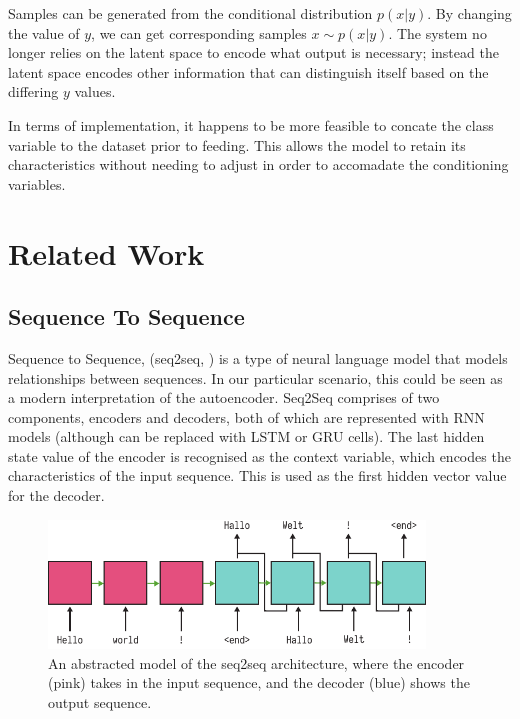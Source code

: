 \documentclass[12pt,twoside]{report}
\begin{document}
Samples can be generated from the conditional distribution $p(x|y)$. By changing the value of $y$, we can get corresponding samples $x \sim p(x|y)$. The system no longer relies on the latent space to encode what output is necessary; instead the latent space encodes other information that can distinguish itself based on the differing $y$ values.



In terms of implementation, it happens to be more feasible to concate the class variable to the dataset prior to feeding. This allows the model to retain its characteristics without needing to adjust in order to accomadate the conditioning variables.


\section{Related Work}

\subsection{Sequence To Sequence}

Sequence to Sequence, (seq2seq, \cite{sutskever_sequence_2014}) is a type of neural language model that models relationships between sequences. In our particular scenario, this could be seen as a modern interpretation of the autoencoder. Seq2Seq comprises of two components, encoders and decoders, both of which are represented with RNN models (although can be replaced with LSTM or GRU cells). The last hidden state value of the encoder is recognised as the context variable, which encodes the characteristics of the input sequence. This is used as the first hidden vector value for the decoder. 

\begin{figure}[!ht]
		
\centering
\includegraphics[width=100mm]{diagrams/seq2seq.pdf}
\caption{An abstracted model of the seq2seq architecture, where the encoder (pink) takes in the input sequence, and the decoder (blue) shows the output sequence.\label{seq2seq}}
\end{figure}
\end{document}
